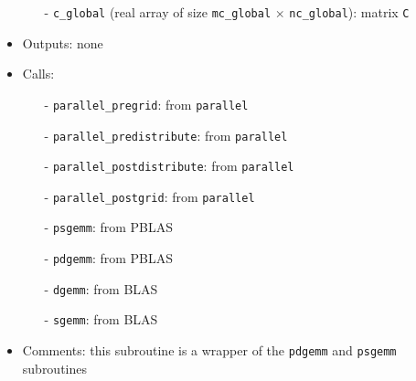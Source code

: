 \documentclass[12pt]{article}
\begin{document}
\begin{itemize}
\begin{itemize}
\item[-] {\tt c\_global} (real array of size {\tt mc\_global} $\times$ {\tt nc\_global}): matrix {\tt C}
\end{itemize}
\item Outputs: none
\item Calls: 
\begin{itemize}
\item[-] {\tt parallel\_pregrid}: from {\tt parallel}
\item[-] {\tt parallel\_predistribute}: from {\tt parallel}
\item[-] {\tt parallel\_postdistribute}: from {\tt parallel}
\item[-] {\tt parallel\_postgrid}: from {\tt parallel}
\item[-] {\tt psgemm}: from PBLAS
\item[-] {\tt pdgemm}: from PBLAS
\item[-] {\tt dgemm}: from BLAS
\item[-] {\tt sgemm}: from BLAS
\end{itemize}
\item Comments: this subroutine is a wrapper of the {\tt pdgemm} and {\tt psgemm} subroutines 
\end{itemize} 
\end{document}
